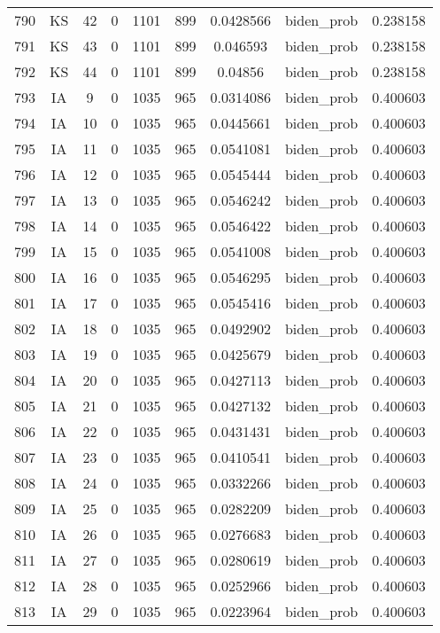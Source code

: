 \documentclass[12pt,a4paper]{article}
\begin{document}
\begin{tabular}{r|cccccccc}
	790 & KS & 42 & 0 & 1101 & 899 & 0.0428566 & biden\_prob & 0.238158 \\
	791 & KS & 43 & 0 & 1101 & 899 & 0.046593 & biden\_prob & 0.238158 \\
	792 & KS & 44 & 0 & 1101 & 899 & 0.04856 & biden\_prob & 0.238158 \\
	793 & IA & 9 & 0 & 1035 & 965 & 0.0314086 & biden\_prob & 0.400603 \\
	794 & IA & 10 & 0 & 1035 & 965 & 0.0445661 & biden\_prob & 0.400603 \\
	795 & IA & 11 & 0 & 1035 & 965 & 0.0541081 & biden\_prob & 0.400603 \\
	796 & IA & 12 & 0 & 1035 & 965 & 0.0545444 & biden\_prob & 0.400603 \\
	797 & IA & 13 & 0 & 1035 & 965 & 0.0546242 & biden\_prob & 0.400603 \\
	798 & IA & 14 & 0 & 1035 & 965 & 0.0546422 & biden\_prob & 0.400603 \\
	799 & IA & 15 & 0 & 1035 & 965 & 0.0541008 & biden\_prob & 0.400603 \\
	800 & IA & 16 & 0 & 1035 & 965 & 0.0546295 & biden\_prob & 0.400603 \\
	801 & IA & 17 & 0 & 1035 & 965 & 0.0545416 & biden\_prob & 0.400603 \\
	802 & IA & 18 & 0 & 1035 & 965 & 0.0492902 & biden\_prob & 0.400603 \\
	803 & IA & 19 & 0 & 1035 & 965 & 0.0425679 & biden\_prob & 0.400603 \\
	804 & IA & 20 & 0 & 1035 & 965 & 0.0427113 & biden\_prob & 0.400603 \\
	805 & IA & 21 & 0 & 1035 & 965 & 0.0427132 & biden\_prob & 0.400603 \\
	806 & IA & 22 & 0 & 1035 & 965 & 0.0431431 & biden\_prob & 0.400603 \\
	807 & IA & 23 & 0 & 1035 & 965 & 0.0410541 & biden\_prob & 0.400603 \\
	808 & IA & 24 & 0 & 1035 & 965 & 0.0332266 & biden\_prob & 0.400603 \\
	809 & IA & 25 & 0 & 1035 & 965 & 0.0282209 & biden\_prob & 0.400603 \\
	810 & IA & 26 & 0 & 1035 & 965 & 0.0276683 & biden\_prob & 0.400603 \\
	811 & IA & 27 & 0 & 1035 & 965 & 0.0280619 & biden\_prob & 0.400603 \\
	812 & IA & 28 & 0 & 1035 & 965 & 0.0252966 & biden\_prob & 0.400603 \\
	813 & IA & 29 & 0 & 1035 & 965 & 0.0223964 & biden\_prob & 0.400603 \\

\end{tabular}
\end{document}
